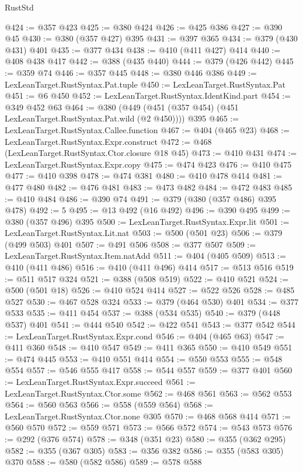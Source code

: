 \begin{lexlean}{RustStd}
\begin{coremodule}
@424 := @357 @423
@425 := @380 @424
@426 := @425 @386
@427 := @390 @45
@430 := @380 (@357 @427) @395
@431 := @397 @365
@434 := @379 (@430 @431) @401
@435 := @377 @434
@438 := @410 (@411 @427) @414
@440 := @408 @438 @417
@442 := @388 (@435 @440)
@444 := @379 (@426 @442)
@445 := @359 @74
@446 := @357 @445
@448 := @380 @446 @386
@449 := LexLeanTarget.RustSyntax.Pat.tuple
@450 := LexLeanTarget.RustSyntax.Pat
@451 := @6 @450
@452 := LexLeanTarget.RustSyntax.IdentKind.part
@454 := @349 @452 @63
@464 := @380 (@449 (@451 (@357 @454) (@451 LexLeanTarget.RustSyntax.Pat.wild (@2 @450)))) @395
@465 := LexLeanTarget.RustSyntax.Callee.function
@467 := @404 (@465 @23)
@468 := LexLeanTarget.RustSyntax.Expr.construct
@472 := @468 (LexLeanTarget.RustSyntax.Ctor.closure @18 @45)
@473 := @410 @431
@474 := LexLeanTarget.RustSyntax.Expr.copy
@475 := @474 @423
@476 := @410 @475
@477 := @410 @398
@478 := @474 @381
@480 := @410 @478 @414
@481 := @477 @480
@482 := @476 @481
@483 := @473 @482
@484 := @472 @483
@485 := @410 @484
@486 := @390 @74
@491 := @379 (@380 (@357 @486) @395 @478)
@492 := 5
@495 := @13 @492 (@16 @492)
@496 := @390 @495
@499 := @380 (@357 @496) @395
@500 := LexLeanTarget.RustSyntax.Expr.lit
@501 := LexLeanTarget.RustSyntax.Lit.nat
@503 := @500 (@501 @23)
@506 := @379 (@499 @503) @401
@507 := @491 @506
@508 := @377 @507
@509 := LexLeanTarget.RustSyntax.Item.natAdd
@511 := @404 (@405 @509)
@513 := @410 (@411 @486)
@516 := @410 (@411 @496) @414
@517 := @513 @516
@519 := @511 @517 @324
@521 := @388 (@508 @519)
@522 := @410 @521
@524 := @500 (@501 @18)
@526 := @410 @524 @414
@527 := @522 @526
@528 := @485 @527
@530 := @467 @528 @324
@533 := @379 (@464 @530) @401
@534 := @377 @533
@535 := @411 @454
@537 := @388 (@534 @535)
@540 := @379 (@448 @537) @401
@541 := @444 @540
@542 := @422 @541
@543 := @377 @542
@544 := LexLeanTarget.RustSyntax.Expr.cond
@546 := @404 (@465 @63)
@547 := @411 @360
@548 := @410 @547
@549 := @411 @365
@550 := @410 @549
@551 := @474 @445
@553 := @410 @551 @414
@554 := @550 @553
@555 := @548 @554
@557 := @546 @555 @417
@558 := @544 @557
@559 := @377 @401
@560 := LexLeanTarget.RustSyntax.Expr.succeed
@561 := LexLeanTarget.RustSyntax.Ctor.some
@562 := @468 @561
@563 := @562 @553
@564 := @560 @563
@566 := @558 (@559 @564)
@568 := LexLeanTarget.RustSyntax.Ctor.none @305
@570 := @468 @568 @414
@571 := @560 @570
@572 := @559 @571
@573 := @566 @572
@574 := @543 @573
@576 := @292 (@376 @574)
@578 := @348 (@351 @23)
@580 := @355 (@362 @295)
@582 := @355 (@367 @305)
@583 := @356 @382
@586 := @355 (@583 @305) @370
@588 := @580 (@582 @586)
@589 := @578 @588

\end{coremodule}
\end{lexlean}
